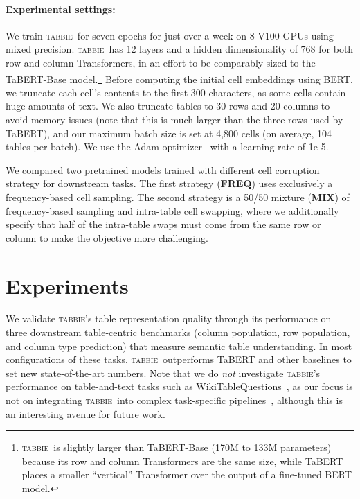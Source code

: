 \documentclass[11pt]{article}
\newcommand{\name}[0]{\textsc{tabbie}}
\newcommand{\freq}[0]{\textbf{FREQ}}
\newcommand{\mix}[0]{\textbf{MIX}}
\begin{document}
\paragraph{Experimental settings:} We train \name\ for seven epochs for just over a week on 8 V100 GPUs using mixed precision. \name\ has 12 layers and a hidden dimensionality of $768$ for both row and column Transformers, in an effort to be comparably-sized to the TaBERT-Base model.\footnote{\name\ is slightly larger than TaBERT-Base (170M to 133M parameters) because its row and column Transformers are the same size, while TaBERT places a smaller ``vertical'' Transformer over the output of a fine-tuned BERT model.}  Before computing the initial cell embeddings using BERT, we truncate each cell's contents to the first 300 characters, as some cells contain huge amounts of text. We also truncate tables to 30 rows and 20 columns to avoid memory issues (note that this is much larger than the three rows used by TaBERT), and our maximum batch size is set at 4,800 cells (on average, 104 tables per batch). We use the Adam optimizer~\citep{kingma2014adam} with a learning rate of 1e-5.  


We compared two pretrained models trained with different cell corruption strategy for downstream tasks. The first strategy (\freq) uses exclusively a frequency-based cell sampling. The second strategy is a 50/50 mixture (\mix) of frequency-based sampling and intra-table cell swapping, where we additionally specify that half of the intra-table swaps must come from the same row or column to make the objective more challenging.

























%
 \section{Experiments}
\label{sec:experiments}

We validate \name's table representation quality through its performance on three downstream table-centric benchmarks (column population, row population, and column type prediction) that measure semantic table understanding. In most configurations of these tasks, \name\ outperforms TaBERT and other baselines to set new state-of-the-art numbers. Note that we do \emph{not} investigate \name's performance on table-and-text tasks such as WikiTableQuestions~\citep{pasupat2015compositional}, as our focus is not on integrating \name\ into complex task-specific pipelines~\citep{liang2018memory}, although this is an interesting avenue for future work.
\end{document}

